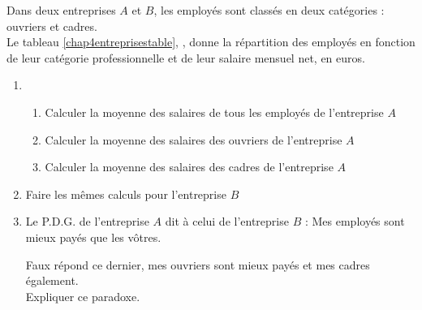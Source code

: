 \begin{exo}\label{chap4entreprises}
Dans deux entreprises $A$ et $B$, les employ\'es sont
class\'es en deux cat\'egories : ouvriers et cadres.\\
Le tableau \ref{chap4entreprisestable}, , donne la
r\'epartition des employ\'es en fonction de leur
cat\'egorie professionnelle et de leur salaire
mensuel net, en euros.

\begin{table}[!h]
 \centering
 \caption{Salaires des entreprise $A$ et $B$ de l'exercice \ref{chap4entreprises}}\label{chap4entreprisestable}

 
 
 \end{table}


\begin{enumerate}
	\item
\begin{enumerate}
	\item Calculer la moyenne des salaires de tous
les employ\'es de l'entreprise $A$
\item Calculer la moyenne des salaires des
ouvriers de l'entreprise $A$
\item Calculer la moyenne des salaires des
cadres de l'entreprise $A$
\end{enumerate}
\item Faire les m\^emes calculs pour l'entreprise $B$
\item Le P.D.G. de l'entreprise $A$ dit \`a celui de l'entreprise $B$ : \og Mes employ\'es sont mieux pay\'es que les vôtres. \fg

\og Faux \fg r\'epond ce dernier, \og mes ouvriers sont mieux pay\'es et mes cadres \'egalement. \fg\\
Expliquer ce paradoxe.
\end{enumerate}



\end{exo}



